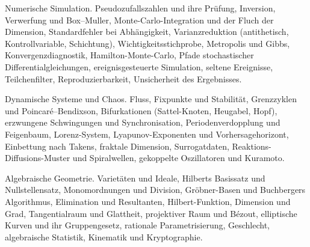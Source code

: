 \begin{merksatz}
Numerische Simulation. Pseudozufallszahlen und ihre Prüfung, Inversion, Verwerfung und Box--Muller, Monte-Carlo-Integration und der Fluch der Dimension, Standardfehler bei Abhängigkeit, Varianzreduktion (antithetisch, Kontrollvariable, Schichtung), Wichtigkeitsstichprobe, Metropolis und Gibbs, Konvergenzdiagnostik, Hamilton-Monte-Carlo, Pfade stochastischer Differentialgleichungen, ereignisgesteuerte Simulation, seltene Ereignisse, Teilchenfilter, Reproduzierbarkeit, Unsicherheit des Ergebnisses.

\end{merksatz}

\begin{merksatz}
Dynamische Systeme und Chaos. Fluss, Fixpunkte und Stabilität, Grenzzyklen und Poincaré--Bendixson, Bifurkationen (Sattel-Knoten, Heugabel, Hopf), erzwungene Schwingungen und Synchronisation, Periodenverdopplung und Feigenbaum, Lorenz-System, Lyapunov-Exponenten und Vorhersagehorizont, Einbettung nach Takens, fraktale Dimension, Surrogatdaten, Reaktions-Diffusions-Muster und Spiralwellen, gekoppelte Oszillatoren und Kuramoto.

\end{merksatz}

\begin{merksatz}
Algebraische Geometrie. Varietäten und Ideale, Hilberts Basissatz und Nullstellensatz, Monomordnungen und Division, Gröbner-Basen und Buchbergers Algorithmus, Elimination und Resultanten, Hilbert-Funktion, Dimension und Grad, Tangentialraum und Glattheit, projektiver Raum und Bézout, elliptische Kurven und ihr Gruppengesetz, rationale Parametrisierung, Geschlecht, algebraische Statistik, Kinematik und Kryptographie.

\end{merksatz}

